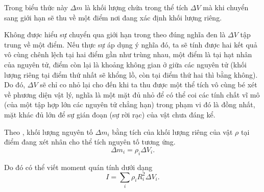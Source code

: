 \noindent
Trong biểu thức này $\Delta m$ là khối lượng chứa trong thể tích $\Delta V$ mà khi chuyển sang giới hạn sẽ thu về một điểm nơi đang xác định khối lượng riêng.

Không được hiểu sự chuyển qua giới hạn trong  theo đúng nghĩa đen là $\Delta V$ tập trung về một điểm. Nếu thực sự áp dụng ý nghĩa đó, ta sẽ tính được hai kết quả vô cùng chênh lệch tại hai điểm gần như trùng nhau, một điểm là tại hạt nhân của nguyên tử, điểm còn lại là khoảng không gian ở giữa các nguyên tử (khối lượng riêng tại điểm thứ nhất sẽ khổng lồ, còn tại điểm thứ hai thì bằng không). Do đó, $\Delta V$ sẽ chỉ co nhỏ lại cho đến khi ta thu được một thể tích vô cùng bé xét về phương diện vật lý, nghĩa là một mặt đủ nhỏ để có thể coi các tính chất vĩ mô (của một tập hợp lớn các nguyên tử chẳng hạn) trong phạm vi đó là đồng nhất, mặt khác đủ lớn để sự gián đoạn (sự rời rạc) của vật chưa đáng kể.

Theo , khối lượng nguyên tố $\Delta m_i$ bằng tích của khối lượng riêng của vật $\rho$ tại điểm đang xét nhân cho thể tích nguyên tố tương ứng.
\begin{equation*}
\Delta m_i = \rho_i \Delta V_i.
\end{equation*}

\noindent
Do đó có thể viết moment quán tính dưới dạng
\begin{equation}\label{eq:5_19}
I = \sum_i \rho_i R_i^2 \Delta V_i.
\end{equation}

